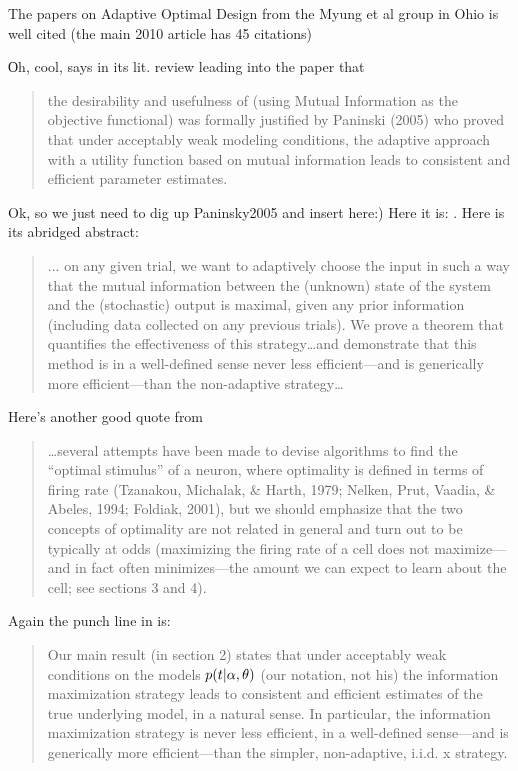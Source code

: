 The papers on Adaptive Optimal Design from the Myung et al group in Ohio is well
cited (the main 2010 \cite{Cavagnaro2010} article has 45 citations) 

Оh, cool,  \cite{Cavagnaro2010} says in its lit. review leading into the paper
that 
\begin{quote}
the desirability and usefulness of (using Mutual Information as the objective
functional) was formally justified by Paninski (2005) who proved that under
acceptably weak modeling conditions, the adaptive approach with a utility function
based on mutual information leads to consistent and efficient parameter
estimates. 
\end{quote}

Ok, so we just need to dig up Paninsky2005 and insert here:) Here it is:
\cite{Paninski2005}. Here is its abridged abstract:
\begin{quote}
... on any given trial,
we want to adaptively choose the input in such a way that the mutual information
between the (unknown) state of the system and the (stochastic)
output is maximal, given any prior information (including data collected
on any previous trials). We prove a theorem that quantifies the effectiveness
of this strategy\ldots and demonstrate that
this method is in a well-defined sense never less efficient—and is generically
more efficient—than the non-adaptive strategy\ldots  
\end{quote}

Here's another good quote from 
\begin{quote}
\ldots several attempts have been made to devise algorithms
to find the “optimal stimulus” of a neuron, where optimality is
defined in terms of firing rate (Tzanakou, Michalak, & Harth, 1979; Nelken,
Prut, Vaadia, & Abeles, 1994; Foldiak, 2001), but we should emphasize that
the two concepts of optimality are not related in general and turn out to be
typically at odds (maximizing the firing rate of a cell does not maximize—
and in fact often minimizes—the amount we can expect to learn about the
cell; see sections 3 and 4).
\end{quote}
Again the punch line in \cite{Paninski2005} is:
\begin{quote}
Our main result (in section 2) states that under
acceptably weak conditions on the models $p(t| \alpha, { \theta})$ (our notation, not
his) the information maximization strategy leads to consistent and
efficient estimates of the true underlying model, in a natural sense. 
In particular, the information maximization
strategy is never less efficient, in a well-defined sense—and
is generically more efficient—than the simpler, non-adaptive, i.i.d. x strategy.
\end{quote}



